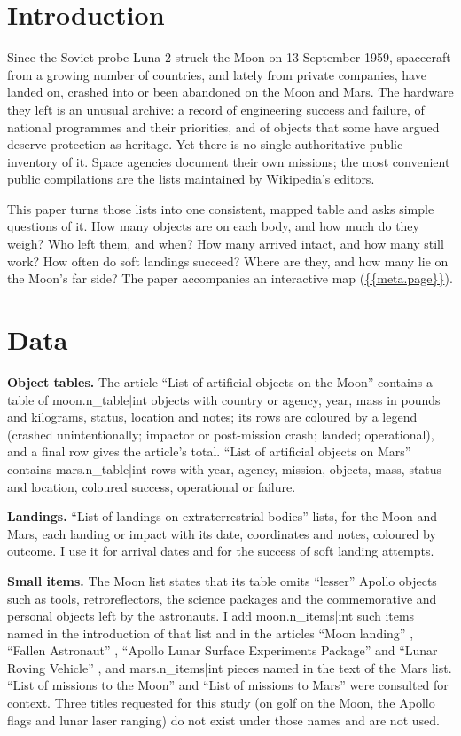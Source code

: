 \documentclass[11pt,a4paper]{article}
\begin{document}
\section{Introduction}
Since the Soviet probe Luna 2 struck the Moon on 13 September 1959, spacecraft from a growing number of countries, and lately from private companies, have landed on, crashed into or been abandoned on the Moon and Mars. The hardware they left is an unusual archive: a record of engineering success and failure, of national programmes and their priorities, and of objects that some have argued deserve protection as heritage. Yet there is no single authoritative public inventory of it. Space agencies document their own missions; the most convenient public compilations are the lists maintained by Wikipedia's editors.

This paper turns those lists into one consistent, mapped table and asks simple questions of it. How many objects are on each body, and how much do they weigh? Who left them, and when? How many arrived intact, and how many still work? How often do soft landings succeed? Where are they, and how many lie on the Moon's far side? The paper accompanies an interactive map (\url{{{meta.page}}}).

\section{Data}
\textbf{Object tables.} The article ``List of artificial objects on the Moon'' \citep{wikimoon} contains a table of {{moon.n_table|int}} objects with country or agency, year, mass in pounds and kilograms, status, location and notes; its rows are coloured by a legend (crashed unintentionally; impactor or post-mission crash; landed; operational), and a final row gives the article's total. ``List of artificial objects on Mars'' \citep{wikimars} contains {{mars.n_table|int}} rows with year, agency, mission, objects, mass, status and location, coloured success, operational or failure.

\textbf{Landings.} ``List of landings on extraterrestrial bodies'' \citep{wikilandings} lists, for the Moon and Mars, each landing or impact with its date, coordinates and notes, coloured by outcome. I use it for arrival dates and for the success of soft landing attempts.

\textbf{Small items.} The Moon list states that its table omits ``lesser'' Apollo objects such as tools, retroreflectors, the science packages and the commemorative and personal objects left by the astronauts. I add {{moon.n_items|int}} such items named in the introduction of that list and in the articles ``Moon landing'' \citep{wikimoonlanding}, ``Fallen Astronaut'' \citep{wikifallen}, ``Apollo Lunar Surface Experiments Package'' \citep{wikialsep} and ``Lunar Roving Vehicle'' \citep{wikilrv}, and {{mars.n_items|int}} pieces named in the text of the Mars list. ``List of missions to the Moon'' and ``List of missions to Mars'' \citep{wikimissionsmoon,wikimissionsmars} were consulted for context. Three titles requested for this study (on golf on the Moon, the Apollo flags and lunar laser ranging) do not exist under those names and are not used.
\end{document}
